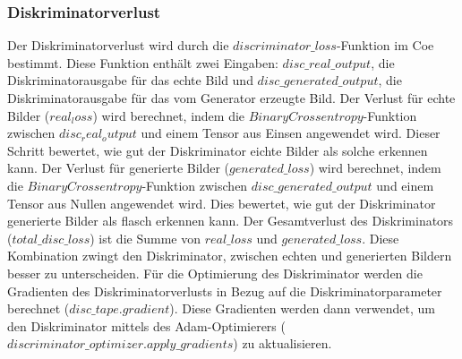 \subsubsection{Diskriminatorverlust}
Der Diskriminatorverlust wird durch die $discriminator\_loss$-Funktion im Coe bestimmt. Diese Funktion enthält zwei Eingaben: $disc\_real\_output$, die Diskriminatorausgabe für das echte Bild und $disc\_generated\_output$, die Diskriminatorausgabe für das vom Generator erzeugte Bild. Der Verlust für echte Bilder ($real_loss$) wird berechnet, indem die $BinaryCrossentropy$-Funktion zwischen $disc_real_output$ und einem Tensor aus Einsen angewendet wird. Dieser Schritt bewertet, wie gut der Diskriminator eichte Bilder als solche erkennen kann.
Der Verlust für generierte Bilder ($generated\_loss$) wird berechnet, indem die $BinaryCrossentropy$-Funktion zwischen $disc\_generated\_output$ und einem Tensor aus Nullen angewendet wird. Dies bewertet, wie gut der Diskriminator generierte Bilder als flasch erkennen kann.
\newline
Der Gesamtverlust des Diskriminators ($total\_disc\_loss$) ist die Summe von $real\_loss$ und $generated\_loss$. Diese Kombination zwingt den Diskriminator, zwischen echten und generierten Bildern besser zu unterscheiden.
\newline
Für die Optimierung des Diskriminator werden die Gradienten des Diskriminatorverlusts in Bezug auf die Diskriminatorparameter berechnet ($disc\_tape.gradient$). Diese Gradienten werden dann verwendet, um den Diskriminator mittels des Adam-Optimierers ($discriminator\_optimizer.apply\_gradients$) zu aktualisieren.

